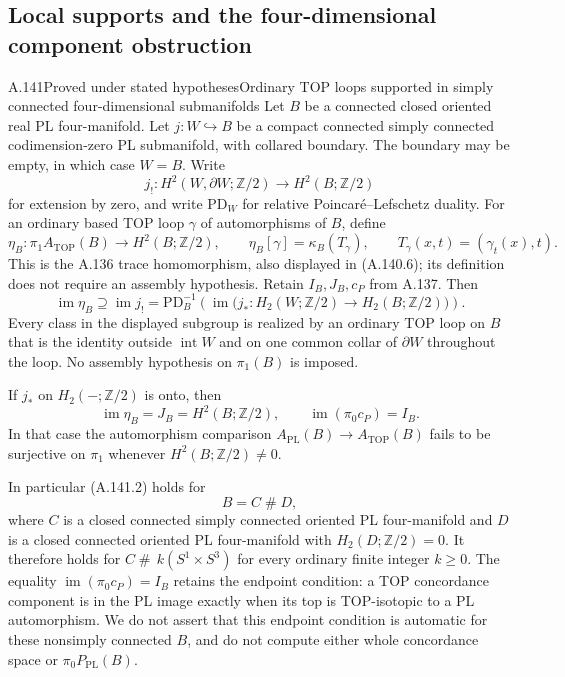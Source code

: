 \subsection{Local supports and the four-dimensional component obstruction}

\begin{saresult}{A.141}{Proved under stated hypotheses}{Ordinary TOP loops supported in simply connected four-dimensional submanifolds}
Let $B$ be a connected closed oriented real PL four-manifold.
Let $j:W\hookrightarrow B$ be a compact connected simply connected
codimension-zero PL submanifold, with collared boundary. The boundary
may be empty, in which case $W=B$. Write
\[
 j_!:H^2(W,\partial W;\mathbb Z/2)
                \longrightarrow H^2(B;\mathbb Z/2)
\]
for extension by zero, and write $\mathrm{PD}_W$ for relative
Poincar\'e--Lefschetz duality. For an ordinary based TOP loop
$\gamma$ of automorphisms of $B$, define
\[
 \eta_B:\pi_1 A_{\mathrm{TOP}}(B)\longrightarrow H^2(B;\mathbb Z/2),
 \qquad \eta_B[\gamma]=\kappa_B(T_\gamma),
 \qquad T_\gamma(x,t)=(\gamma_t(x),t).
\]
This is the A.136 trace homomorphism, also displayed in
(A.140.6); its definition does not require an assembly hypothesis.
Retain $I_B,J_B,c_P$ from A.137.
Then
\[
 \operatorname{im}\eta_B\supseteq\operatorname{im}j_!
   =\mathrm{PD}_B^{-1}\!\left(
       \operatorname{im}\bigl(j_*:H_2(W;\mathbb Z/2)
                            \to H_2(B;\mathbb Z/2)\bigr)\right).
                                                               \tag{A.141.1}
\]
Every class in the displayed subgroup is realized by an ordinary
TOP loop on $B$ that is the identity outside $\operatorname{int}W$
and on one common collar of $\partial W$ throughout the loop.
No assembly hypothesis on $\pi_1(B)$ is imposed.

If $j_*$ on $H_2(-;\mathbb Z/2)$ is onto, then
\[
 \operatorname{im}\eta_B=J_B=H^2(B;\mathbb Z/2),
 \qquad
 \operatorname{im}(\pi_0c_P)=I_B.                    \tag{A.141.2}
\]
In that case the automorphism comparison
$A_{\mathrm{PL}}(B)\to A_{\mathrm{TOP}}(B)$ fails to be
surjective on $\pi_1$ whenever $H^2(B;\mathbb Z/2)\ne0$.

In particular (A.141.2) holds for
\[
 B=C\mathbin{\#}D,
\]
where $C$ is a closed connected simply connected oriented PL
four-manifold and $D$ is a closed connected oriented PL
four-manifold with $H_2(D;\mathbb Z/2)=0$. It therefore holds for
$C\mathbin{\#}\,k(S^1\times S^3)$ for every ordinary finite
integer $k\ge0$.
The equality $\operatorname{im}(\pi_0c_P)=I_B$ retains the
endpoint condition: a TOP concordance component is in the PL
image exactly when its top is TOP-isotopic to a PL automorphism.
We do not assert that this endpoint condition is automatic for
these nonsimply connected $B$, and do not compute either whole
concordance space or $\pi_0P_{\mathrm{PL}}(B)$.

\end{saresult}
